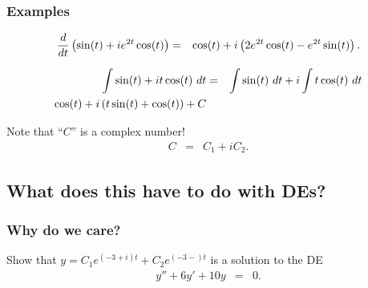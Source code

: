 \begin{frame}
  \frametitle{Examples}

  \begin{eqnarray*}
    \frac{d}{dt} \left( \sin(t) + i e^{2t} \cos(t) \right) & = & 
    \cos(t) + i \left( 2 e^{2t} \cos(t) - e^{2t} \sin(t) \right).
  \end{eqnarray*}

  \begin{eqnarray*}
    \int \sin(t) + i t \cos(t) ~ dt & = & 
    \int \sin(t) ~ dt + i \int t \cos(t) ~ dt \\
    \cos(t) + i \left( t\sin(t) + \cos(t) \right) + C
  \end{eqnarray*}

  Note that ``$C$'' is a complex number!
  \begin{eqnarray*}
    C & = & C_1 + i C_2.
  \end{eqnarray*}

\end{frame}

\subsection{What does this have to do with DEs?}

\begin{frame}
  \frametitle{Why do we care?}

  Show that $y=C_1 e^{(-3+i)t} + C_2 e^{(-3-)t}$ is a solution to the DE
  \begin{eqnarray*}
    y'' + 6y' + 10y & = & 0.
  \end{eqnarray*}

\end{frame}




